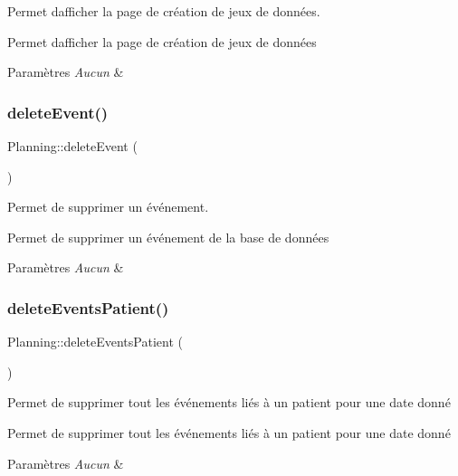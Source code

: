 Permet d\textquotesingle{}afficher la page de création de jeux de données. 

Permet d\textquotesingle{}afficher la page de création de jeux de données 
\begin{DoxyParams}{Paramètres}
{\em Aucun} & \\
\hline
\end{DoxyParams}
\mbox{\label{class_planning_a197c471a87c2aec5de71515df72b0500}} 
\subsubsection{\texorpdfstring{delete\+Event()}{deleteEvent()}}
{\footnotesize\ttfamily Planning\+::delete\+Event (\begin{DoxyParamCaption}{ }\end{DoxyParamCaption})}



Permet de supprimer un événement. 

Permet de supprimer un événement de la base de données 
\begin{DoxyParams}{Paramètres}
{\em Aucun} & \\
\hline
\end{DoxyParams}
\mbox{\label{class_planning_acff72c08ea0453801ab71d6d49e69c39}} 
\subsubsection{\texorpdfstring{delete\+Events\+Patient()}{deleteEventsPatient()}}
{\footnotesize\ttfamily Planning\+::delete\+Events\+Patient (\begin{DoxyParamCaption}{ }\end{DoxyParamCaption})}



Permet de supprimer tout les événements liés à un patient pour une date donné 

Permet de supprimer tout les événements liés à un patient pour une date donné 
\begin{DoxyParams}{Paramètres}
{\em Aucun} & \\
\hline
\end{DoxyParams}
\mbox{\label{class_planning_a5e204727ba60baf33ea8e45ffd57459c}} 
